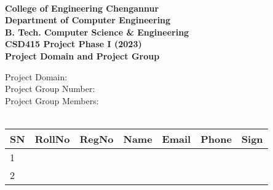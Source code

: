 \documentclass{article}
\begin{document}
    \begin{center}
        \textbf{
                \\College of Engineering Chengannur
                \\Department of Computer Engineering
                \\B. Tech. Computer Science \& Engineering
                \\CSD415 Project Phase I (2023)
                \\Project Domain and Project Group}
    \end{center}
    Project Domain:
    \\Project Group Number: 
    \\Project Group Members:\\
    \\
    \begin{tabular}
        {|p{1cm}|p{1cm}|p{1.5cm}|p{5cm}|p{3cm}|p{1.5cm}|p{1.5cm}|}
        \hline
        \centering SN & \centering RollNo & \centering RegNo & \centering Name & \centering Email & \centering Phone & Sign\\
        \hline
        1&&&&&&\\[5ex]
        \hline
        2&&&&&&\\[5ex]
        \hline
    \end{tabular}
\end{document}
